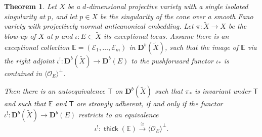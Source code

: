 \documentclass[a4paper,11pt, reqno]{amsart}
\def\E{\mathbb E}
\def\DD{\mathbf D}
\def\OO{\mathcal O}
\def\sE{\mathscr{E}}
\newcommand{\opname}[1]{\operatorname{\mathsf{#1}}}
\newcommand{\thick}{\opname{thick}\nolimits}
\def\Db{\DD^b}
\newcommand{\bT}{\mathsf{T}}
\theoremstyle{plain}
\newtheorem{theorem}[dummy]{Theorem}
\theoremstyle{definition}
\numberwithin{equation}{section}
\newlength{\arrow}
\begin{document}
\begin{theorem}\label{thm:strong-adherence-equiv}
    Let $X$ be a $d$-dimensional projective variety with a single isolated singularity at $p$, and let $p\in X$ be the singularity of the cone over a smooth Fano variety 
    with projectively normal anticanonical embedding. 
     Let
    $\pi \colon \tilde{X} \to X$ be the blow-up of $X$ at $p$ and $\iota \colon E \subset \tilde{X}$ its exceptional locus.
    Assume
    there is an exceptional collection $\E = ( \sE_1 , \ldots , \sE_m ) $ in $\Db ( \tilde{X} )$, such that the image of $\E$ via the right adjoint $\iota^! \colon \Db ( \tilde{X} ) \to \Db(E)$ to the pushforward functor $\iota_\ast$ is contained in $\langle \OO_E \rangle^{\perp}$.
    
    Then there is an autoequivalence $\bT$ on $\Db ( \tilde{X} )$ such that $\pi_\ast$ is invariant under $\bT$ and such that $\E$ and $\bT$ are strongly adherent, if and only if 
      the functor $\iota^! \colon \Db ( \tilde{X} ) \to \Db(E)$ restricts to an equivalence
    \[
    \iota^! \colon \thick ( \E ) \xrightarrow{\cong} \langle \OO_E \rangle^\perp .
    \]

\end{theorem}
\end{document}

